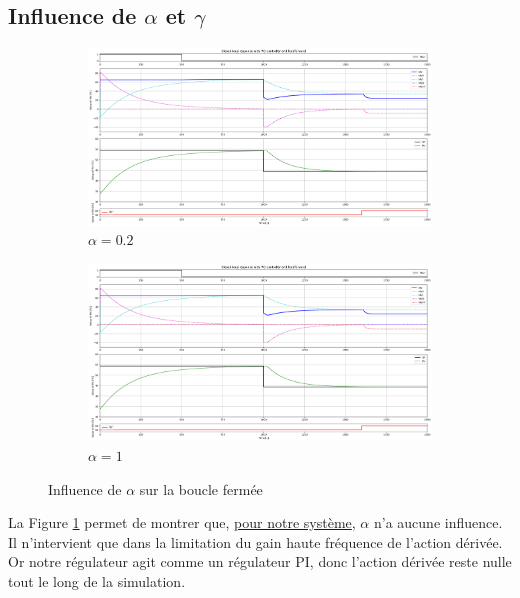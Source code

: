 \subsection{Influence de \texorpdfstring{$\alpha$}{alpha} et \texorpdfstring{$\gamma$}{gamma}}
\begin{figure}[H]
    \centering
    \begin{subfigure}[b]{0.48\textwidth}
        \includegraphics[width=\textwidth]{../Plots/Simulation_scenario_7_alpha=0.2.png}
        \caption{$\alpha = 0.2$}
    \end{subfigure}
    \begin{subfigure}[b]{0.48\textwidth}
        \includegraphics[width=\textwidth]{../Plots/Simulation_scenario_7_alpha=1.png}
        \caption{$\alpha = 1$}
    \end{subfigure}
    \caption{Influence de $\alpha$ sur la boucle fermée}
    \label{fig:Simulation_alpha_influence}
\end{figure}
La Figure \ref{fig:Simulation_alpha_influence} permet de montrer que, \underline{pour notre système}, $\alpha$ n'a aucune influence.
Il n'intervient que dans la limitation du gain haute fréquence de l'action dérivée. Or notre régulateur agit comme un régulateur PI, donc l'action dérivée reste nulle tout le long de la simulation.

